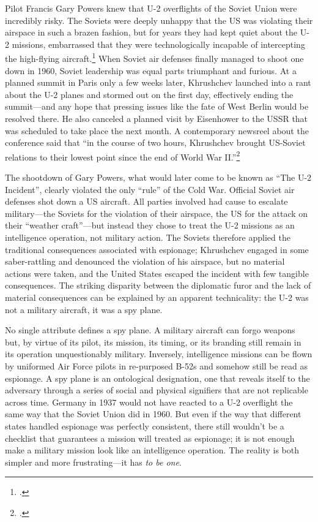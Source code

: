 \documentclass[14pt]{extarticle}
\begin{document}
Pilot Francis Gary Powers knew that U-2 overflights of the Soviet Union were incredibly risky. The Soviets were deeply unhappy that the US was violating their airspace in such a brazen fashion, but for years they had kept quiet about the U-2 missions, embarrassed that they were technologically incapable of intercepting the high-flying aircraft.\footcite[p.~59]{powers_operation_2004} When Soviet air defenses finally managed to shoot one down in 1960, Soviet leadership was equal parts triumphant and furious. At a planned summit in Paris only a few weeks later, Khrushchev launched into a rant about the U-2 planes and stormed out on the first day, effectively ending the summit---and any hope that pressing issues like the fate of West Berlin would be resolved there. He also canceled a planned visit by Eisenhower to the USSR that was scheduled to take place the next month. A contemporary newsreel about the conference said that \enquote{in the course of two hours, Khrushchev brought US-Soviet relations to their lowest point since the end of World War II.}\footcite{universal_studios_summit_1960}

The shootdown of Gary Powers, what would later come to be known as \enquote{The U-2 Incident}, clearly violated the only \enquote{rule} of the Cold War. Official Soviet air defenses shot down a US aircraft. All parties involved had cause to escalate military---the Soviets for the violation of their airspace, the US for the attack on their \enquote{weather craft}---but instead they chose to treat the U-2 missions as an intelligence operation, not military action. The Soviets therefore applied the traditional consequences associated with espionage; Khrushchev engaged in some saber-rattling and denounced the violation of his airspace, but no material actions were taken, and the United States escaped the incident with few tangible consequences. The striking disparity between the diplomatic furor and the lack of material consequences can be explained by an apparent technicality: the U-2 was not a military aircraft, it was a spy plane.

No single attribute defines a spy plane. A military aircraft can forgo weapons but, by virtue of its pilot, its mission, its timing, or its branding still remain in its operation unquestionably military. Inversely, intelligence missions can be flown by uniformed Air Force pilots in re-purposed B-52s and somehow still be read as espionage. A spy plane is an ontological designation, one that reveals itself to the adversary through a series of social and physical signifiers that are not replicable across time. Germany in 1937 would not have reacted to a U-2 overflight the same way that the Soviet Union did in 1960. But even if the way that different states handled espionage was perfectly consistent, there still wouldn't be a checklist that guarantees a mission will treated as espionage; it is not enough make a military mission look like an intelligence operation. The reality is both simpler and more frustrating---it has \emph{to be one}.
\end{document}
